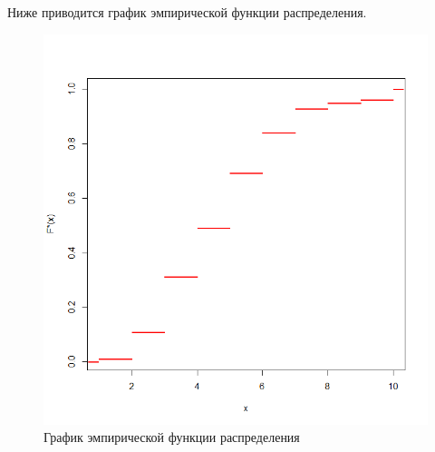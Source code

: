 \documentclass[14pt,a4paper]{scrartcl}
\theoremstyle{definition}
\theoremstyle{remark}
\theoremstyle{definition}
\theoremstyle{definition}
\begin{document}
Ниже приводится график эмпирической функции распределения.

\begin{figure}[H]
  \includegraphics[width=\linewidth]{RPlotDistrFunc1.png}
  \caption{График эмпирической функции распределения}
  \label{fig:image4}
\end{figure}
\end{document}
